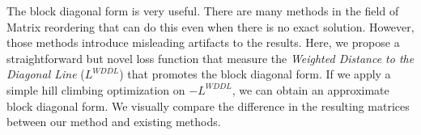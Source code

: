 The block diagonal form is very useful.
There are many methods in the field of Matrix reordering that can do this even when there is no exact solution.
However, those methods introduce misleading artifacts to the results.
Here, we propose a straightforward but novel loss function that measure the \emph{Weighted Distance to the Diagonal Line} ($L^{WDDL}$) that promotes the block diagonal form.
If we apply a simple hill climbing optimization on $-L^{WDDL}$, we can obtain an approximate block diagonal form.
We visually compare the difference in the resulting matrices between our method and existing methods.
